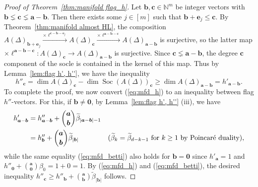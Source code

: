 \documentclass[11pt]{article}
\theoremstyle{definition}
\numberwithin{equation}{section}
\DeclareMathOperator{\Soc}{Soc}
\begin{document}
\begin{proof}[Proof of Theorem~\ref{thm:manifold flag_h}]
Let $\bm{b}, \bm{c} \in \mathbb{N}^m$ be integer vectors with $\bm{b} \lneq \bm{c} \lneq \bm{a}-\bm{b}$.
Then there exists some $j\in[m]$ such that $\bm{b}+\bm{e}_j \leq \bm{c}$.
By Theorem~\ref{thm:manifold almost HL}, the composition $A(\Delta)_{\bm{b}+\bm{e}_j} \overset{\times \bm{\ell}^{\bm{c}-\bm{b}-\bm{e}_j}}{\longrightarrow} A(\Delta)_{\bm{c}} \overset{\times \bm{\ell}^{\bm{a}-\bm{b}-\bm{c}}}{\longrightarrow} A(\Delta)_{\bm{a}-\bm{b}}$ is surjective, so the latter map $\times \bm{\ell}^{\bm{a}-\bm{b}-\bm{c}}:A(\Delta)_{\bm{c}} \rightarrow A(\Delta)_{\bm{a}-\bm{b}}$ is surjective.
Since $\bm{c} \lneq \bm{a}-\bm{b}$, the degree $\bm{c}$ component of the socle is contained in the kernel of this map. 
Thus by Lemma~\ref{lem:flag h', h''}, we have the inequality
\begin{equation}
h''_{\bm{c}}=\dim A(\Delta)_{\bm{c}} - \dim \Soc(A(\Delta))_{\bm{c}} \geq \dim A(\Delta)_{\bm{a}-\bm{b}} = h'_{\bm{a}-\bm{b}}. \label{eq:mfd_h}
\end{equation}
To complete the proof, we now convert (\ref{eq:mfd_h}) to an inequality between flag $h''$-vectors.
For this, if $\bm{b}\neq\bm{0}$, by Lemma~\ref{lem:flag h', h''} (iii), we have 
\begin{align}
h'_{\bm{a}-\bm{b}} &=h''_{\bm{a}-\bm{b}}+\binom{\bm{a}}{\bm{b}}\widetilde{\beta}_{|\bm{a}-\bm{b}|-1} & \notag \\
&=h''_{\bm{b}} + \binom{\bm{a}}{\bm{b}}\widetilde{\beta}_{|\bm{b}|} & (\widetilde{\beta}_{k}=\widetilde{\beta}_{d-k-1} \text{ for } k \geq 1 \text{ by Poincar\'{e} duality}), \label{eq:mfd_betti}
\end{align}
while the same equality (\ref{eq:mfd_betti}) also holds for $\bm{b}=\bm{0}$ since $h'_{\bm{a}}=1$ and $h''_{\bm{0}}+\binom{\bm{a}}{\bm{0}}\beta_{0}=1+0=1$. By (\ref{eq:mfd_h}) and (\ref{eq:mfd_betti}), the desired inequality $h''_{\bm{c}} \geq h''_{\bm{b}}+\binom{\bm{a}}{\bm{b}}\widetilde{\beta}_{|\bm{b}|}$ follows.
\end{proof}
\end{document}
